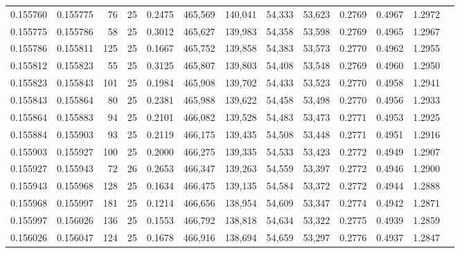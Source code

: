 \begin{tabular}{rrrrrrrrrrrrr}
0.155760 & 0.155775 &    76 &  25 &                                     0.2475 & 465,569 & 140,041 &  54,333 &  53,623 & 0.2769 & 0.4967 & 1.2972 \\
0.155775 & 0.155786 &    58 &  25 &                                     0.3012 & 465,627 & 139,983 &  54,358 &  53,598 & 0.2769 & 0.4965 & 1.2967 \\
0.155786 & 0.155811 &   125 &  25 &                                     0.1667 & 465,752 & 139,858 &  54,383 &  53,573 & 0.2770 & 0.4962 & 1.2955 \\
0.155812 & 0.155823 &    55 &  25 &                                     0.3125 & 465,807 & 139,803 &  54,408 &  53,548 & 0.2769 & 0.4960 & 1.2950 \\
0.155823 & 0.155843 &   101 &  25 &                                     0.1984 & 465,908 & 139,702 &  54,433 &  53,523 & 0.2770 & 0.4958 & 1.2941 \\
0.155843 & 0.155864 &    80 &  25 &                                     0.2381 & 465,988 & 139,622 &  54,458 &  53,498 & 0.2770 & 0.4956 & 1.2933 \\
0.155864 & 0.155883 &    94 &  25 &                                     0.2101 & 466,082 & 139,528 &  54,483 &  53,473 & 0.2771 & 0.4953 & 1.2925 \\
0.155884 & 0.155903 &    93 &  25 &                                     0.2119 & 466,175 & 139,435 &  54,508 &  53,448 & 0.2771 & 0.4951 & 1.2916 \\
0.155903 & 0.155927 &   100 &  25 &                                     0.2000 & 466,275 & 139,335 &  54,533 &  53,423 & 0.2772 & 0.4949 & 1.2907 \\
0.155927 & 0.155943 &    72 &  26 &                                     0.2653 & 466,347 & 139,263 &  54,559 &  53,397 & 0.2772 & 0.4946 & 1.2900 \\
0.155943 & 0.155968 &   128 &  25 &                                     0.1634 & 466,475 & 139,135 &  54,584 &  53,372 & 0.2772 & 0.4944 & 1.2888 \\
0.155968 & 0.155997 &   181 &  25 &                                     0.1214 & 466,656 & 138,954 &  54,609 &  53,347 & 0.2774 & 0.4942 & 1.2871 \\
0.155997 & 0.156026 &   136 &  25 &                                     0.1553 & 466,792 & 138,818 &  54,634 &  53,322 & 0.2775 & 0.4939 & 1.2859 \\
0.156026 & 0.156047 &   124 &  25 &                                     0.1678 & 466,916 & 138,694 &  54,659 &  53,297 & 0.2776 & 0.4937 & 1.2847 \\

\end{tabular}
